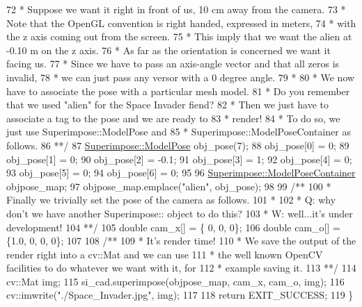 \begin{DoxyCodeInclude}
72 \textcolor{comment}{     * Suppose we want it right in front of us, 10 cm away from the camera.}
73 \textcolor{comment}{     * Note that the OpenGL convention is right handed, expressed in meters,}
74 \textcolor{comment}{     * with the z axis coming out from the screen.}
75 \textcolor{comment}{     * This imply that we want the alien at -0.10 m on the z axis.}
76 \textcolor{comment}{     * As far as the orientation is concerned we want it facing us.}
77 \textcolor{comment}{     * Since we have to pass an axis-angle vector and that all zeros is invalid,}
78 \textcolor{comment}{     * we can just pass any versor with a 0 degree angle.}
79 \textcolor{comment}{     *}
80 \textcolor{comment}{     * We now have to associate the pose with a particular mesh model.}
81 \textcolor{comment}{     * Do you remember that we used "alien" for the Space Invader fiend?}
82 \textcolor{comment}{     * Then we just have to associate a tag to the pose and we are ready to}
83 \textcolor{comment}{     * render!}
84 \textcolor{comment}{     * To do so, we just use Superimpose::ModelPose and}
85 \textcolor{comment}{     * Superimpose::ModelPoseContainer as follows.}
86 \textcolor{comment}{     **/}
87     \mbox{\hyperlink{classSuperimpose_a85d40a5caf19f486d1e0c15c0a025378}{Superimpose::ModelPose}} obj\_pose(7);
88     obj\_pose[0] = 0;
89     obj\_pose[1] = 0;
90     obj\_pose[2] = -0.1;
91     obj\_pose[3] = 1;
92     obj\_pose[4] = 0;
93     obj\_pose[5] = 0;
94     obj\_pose[6] = 0;
95 
96     \mbox{\hyperlink{classSuperimpose_a178e3d4e2def6635bfcf9454dd4b5d22}{Superimpose::ModelPoseContainer}} objpose\_map;
97     objpose\_map.emplace(\textcolor{stringliteral}{"alien"}, obj\_pose);
98 \textcolor{comment}{}
99 \textcolor{comment}{    /**}
100 \textcolor{comment}{     * Finally we trivially set the pose of the camera as follows.}
101 \textcolor{comment}{     *}
102 \textcolor{comment}{     * Q: why don't we have another Superimpose:: object to do this?}
103 \textcolor{comment}{     * W: well...it's under development!}
104 \textcolor{comment}{     **/}
105     \textcolor{keywordtype}{double} cam\_x[] = \{  0, 0, 0\};
106     \textcolor{keywordtype}{double} cam\_o[] = \{1.0, 0, 0, 0\};
107 \textcolor{comment}{}
108 \textcolor{comment}{    /**}
109 \textcolor{comment}{     * It's render time!}
110 \textcolor{comment}{     * We save the output of the render right into a cv::Mat and we can use}
111 \textcolor{comment}{     * the well known OpenCV facilities to do whatever we want with it, for}
112 \textcolor{comment}{     * example saving it.}
113 \textcolor{comment}{     **/}
114     cv::Mat img;
115     si\_cad.superimpose(objpose\_map, cam\_x, cam\_o, img);
116     cv::imwrite(\textcolor{stringliteral}{"./Space\_Invader.jpg"}, img);
117 
118     \textcolor{keywordflow}{return} EXIT\_SUCCESS;
119 \}
\end{DoxyCodeInclude}


